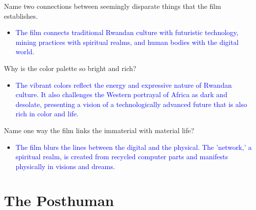 \documentclass[11pt,fleqn]{book}
\begin{document}
\begin{exercise}
Name two connections between seemingly disparate things that the film establishes.
\begin{itemize}
\item \textcolor{blue}{The film connects traditional Rwandan culture with futuristic technology, mining practices with  spiritual realms,  and human bodies with the digital world.}
\end{itemize}
\end{exercise}

\begin{exercise}
Why is the color palette so bright and rich?
\begin{itemize}
    \item \textcolor{blue}{The vibrant colors reflect the energy and expressive nature of Rwandan culture. It also challenges the Western portrayal of Africa as dark and desolate, presenting a vision of a technologically advanced future that is also rich in color and life.}
\end{itemize}
\end{exercise}

\begin{exercise}
Name one way the film links the immaterial with material life?
\begin{itemize}
    \item \textcolor{blue}{The film blurs the lines between the digital and the physical. The 'network,' a spiritual realm,  is created from recycled computer parts and manifests physically in visions and dreams.}
\end{itemize}
\end{exercise}











\section{The Posthuman}
\end{document}
